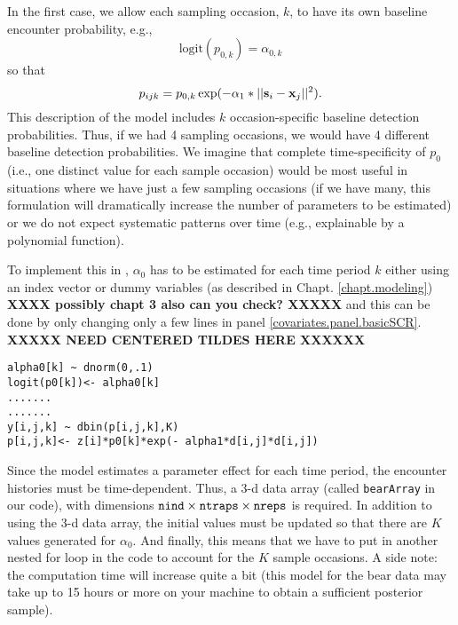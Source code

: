 In the first case, we allow each sampling occasion, $k$, to have its
own baseline encounter probability, e.g.,
\[
\mbox{logit}(p_{0,k}) = \alpha_{0,k}
\]
so that
\[
p_{ijk} = p_{0,k} \exp(- \alpha_1*||{\bf s}_{i}-{\bf x}_{j}||^2).
\]
This description of the model includes $k$ occasion-specific baseline
detection probabilities.  Thus, if we had 4 sampling occasions, we
would have 4 different baseline detection probabilities.  We imagine
that complete time-specificity of $p_{0}$ 
(i.e., one distinct value for each sample occasion)
would be most useful in situations
where we have just a few sampling occasions (if we have many, this
formulation will dramatically increase the number of parameters to be
estimated) or we do not expect systematic patterns over time (e.g.,
explainable by a polynomial function).

To implement this in \jags, $\alpha_0$ has to be
estimated for each time period $k$ either using an index vector or
dummy variables (as described in Chapt. \ref{chapt.modeling}) 
{\bf  XXXX possibly chapt 3 also can you check? XXXXX}
and this can be done by only 
changing only a few lines in 
panel \ref{covariates.panel.basicSCR}.
{\bf XXXXX NEED CENTERED TILDES HERE XXXXXX}
\begin{verbatim}
alpha0[k] ~ dnorm(0,.1)
logit(p0[k])<- alpha0[k]
.......
.......
y[i,j,k] ~ dbin(p[i,j,k],K)
p[i,j,k]<- z[i]*p0[k]*exp(- alpha1*d[i,j]*d[i,j])
\end{verbatim}

Since the model estimates a parameter effect for each time period, the
encounter histories must be time-dependent.  Thus, a 3-d data array
(called \mbox{\tt bearArray} in our code), with dimensions $\mbox{\tt
  nind} \times \mbox{\tt ntraps} \times \mbox{\tt nreps}$ is
required. In addition to using the 3-d data array, the initial values
must be updated so that there are $K$ values generated for $\alpha_0$.
And finally, this means that we have to put in another nested for loop
in the code to account for the $K$ sample occasions.  A side note: the
computation time will increase quite a bit (this model for the bear
data may take up to 15 hours or more on your machine to obtain a
sufficient posterior sample).

